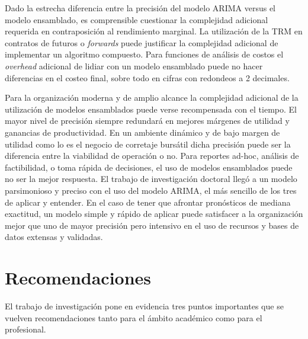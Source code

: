 Dado la estrecha diferencia entre la precisión del modelo ARIMA versus el modelo ensamblado, es comprensible cuestionar la complejidad adicional requerida en contraposición al rendimiento marginal. La utilización de la TRM en contratos de futuros o \emph{forwards} puede justificar la complejidad adicional de implementar un algoritmo compuesto. Para funciones de análisis de costos el \emph{overhead} adicional de lidiar con un modelo ensamblado puede no hacer diferencias en el costeo final, sobre todo en cifras con redondeos a 2 decimales.

Para la organización moderna y de amplio alcance la complejidad adicional de la utilización de modelos ensamblados puede verse recompensada con el tiempo. El mayor nivel de precisión siempre redundará en mejores márgenes de utilidad y ganancias de productividad. En un ambiente dinámico y de bajo margen de utilidad como lo es el negocio de corretaje bursátil dicha precisión puede ser la diferencia entre la viabilidad de operación o no. Para reportes ad-hoc, análisis de factibilidad, o toma rápida de decisiones, el uso de modelos ensamblados puede no ser la mejor respuesta. El trabajo de investigación doctoral llegó a un modelo parsimonioso y preciso con el uso del modelo ARIMA, el más sencillo de los tres de aplicar y entender. En el caso de tener que afrontar pronósticos de mediana exactitud, un modelo simple y rápido de aplicar puede satisfacer a la organización mejor que uno de mayor precisión pero intensivo en el uso de recursos y bases de datos extensas y validadas.

\section{Recomendaciones}
El trabajo de investigación pone en evidencia tres puntos importantes que se vuelven recomendaciones tanto para el ámbito académico como para el profesional.

